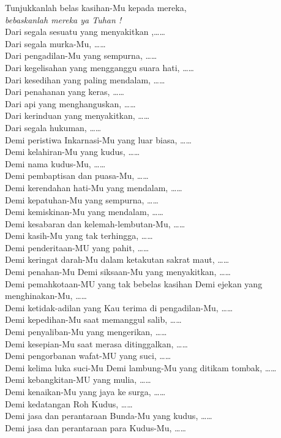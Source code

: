 \documentclass[12pt,a4paper]{article}
\begin{document}
Tunjukkanlah belas kasihan-Mu kepada mereka,\\
\textit{\hspace*{5mm}bebaskanlah mereka ya Tuhan !}\\
Dari segala sesuatu yang menyakitkan ,\ldots\ldots\\
Dari segala murka-Mu, \ldots\ldots\\
Dari pengadilan-Mu yang sempurna, \ldots\ldots\\
Dari kegelisahan yang mengganggu suara hati, \ldots\ldots\\
Dari kesedihan yang paling mendalam, \ldots\ldots\\
Dari penahanan yang keras, \ldots\ldots\\
Dari api yang menghanguskan, \ldots\ldots\\
Dari kerinduan yang menyakitkan, \ldots\ldots\\
Dari segala hukuman, \ldots\ldots\\
Demi peristiwa Inkarnasi-Mu yang luar biasa, \ldots\ldots\\
Demi kelahiran-Mu yang kudus, \ldots\ldots\\
Demi nama kudus-Mu, \ldots\ldots\\
Demi pembaptisan dan puasa-Mu, \ldots\ldots\\
Demi kerendahan hati-Mu yang mendalam, \ldots\ldots\\
Demi kepatuhan-Mu yang sempurna, \ldots\ldots\\
Demi kemiskinan-Mu yang mendalam, \ldots\ldots\\
Demi kesabaran dan kelemah-lembutan-Mu, \ldots\ldots\\
Demi kasih-Mu yang tak terhingga, \ldots\ldots\\
Demi penderitaan-MU yang pahit, \ldots\ldots\\
Demi keringat darah-Mu dalam ketakutan sakrat maut, \ldots\ldots\\
Demi penahan-Mu
Demi siksaan-Mu yang menyakitkan, \ldots\ldots\\
Demi pemahkotaan-MU yang tak bebelas kasihan
Demi ejekan yang menghinakan-Mu, \ldots\ldots\\
Demi ketidak-adilan yang Kau terima di pengadilan-Mu, \ldots\ldots\\
Demi kepedihan-Mu saat memanggul salib, \ldots\ldots\\
Demi penyaliban-Mu yang mengerikan, \ldots\ldots\\
Demi kesepian-Mu saat merasa ditinggalkan, \ldots\ldots\\
Demi pengorbanan wafat-MU yang suci, \ldots\ldots\\
Demi kelima luka suci-Mu
Demi lambung-Mu yang ditikam tombak, \ldots\ldots\\
Demi kebangkitan-MU yang mulia, \ldots\ldots\\
Demi kenaikan-Mu yang jaya ke surga, \ldots\ldots\\
Demi kedatangan Roh Kudus, \ldots\ldots\\
Demi jasa dan perantaraan Bunda-Mu yang kudus, \ldots\ldots\\
Demi jasa dan perantaraan para Kudus-Mu, \ldots\ldots\\
\end{document}
